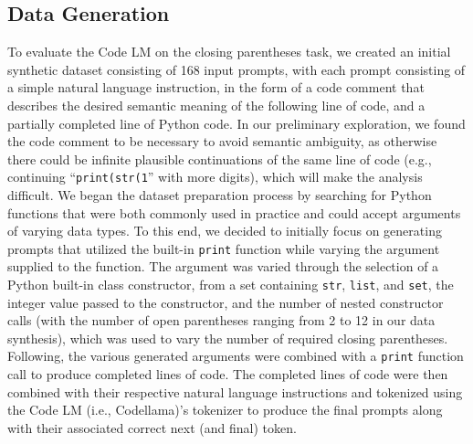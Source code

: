 \subsection{Data Generation} \label{subsec:data-generation}
To evaluate the Code LM on the closing parentheses task, we created an initial synthetic dataset consisting of 168 input prompts, with each prompt consisting of a simple natural language instruction, in the form of a code comment that describes the desired semantic meaning of the following line of code, and a partially completed line of Python code. In our preliminary exploration, we found the code comment to be necessary to avoid semantic ambiguity, as otherwise there could be infinite plausible continuations of the same line of code (e.g., continuing ``\lstinline|print(str(1|'' with more digits), which will make the analysis difficult.
We began the dataset preparation process by searching for Python functions that were both commonly used in practice and could accept arguments of varying data types. To this end, we decided to initially focus on generating prompts that utilized the built-in {\lstinline|print|} function while varying the argument supplied to the function. The argument was varied through the selection of a Python built-in class constructor, from a set containing {\lstinline|str|}, {\lstinline|list|}, and {\lstinline|set|}, the integer value passed to the constructor, and the number of nested constructor calls (with the number of open parentheses ranging from 2 to 12 in our data synthesis), which was used to vary the number of required closing parentheses. Following, the various generated arguments were combined with a {\lstinline|print|} function call to produce completed lines of code. The completed lines of code were then combined with their respective natural language instructions and tokenized using the Code LM (i.e., Codellama)'s tokenizer to produce the final prompts along with their associated correct next (and final) token. 

